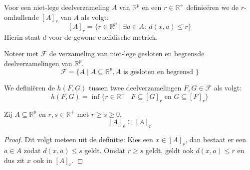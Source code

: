 \documentclass[main.tex]{subfiles}
\begin{document}
\begin{de}
  Voor een niet-lege deelverzameling $A$ van $\mathbb{R}^{p}$ en een $r\in \mathbb{R}^{+}$ definie\"eren we de $r$-omhullende $[A]_{r}$ van $A$ als volgt:
  \[ [A]_{r} = \{r \in \mathbb{R}^{p} \mid \exists a \in A:\ d(x,a) \le r \} \]
  Hierin staat $d$ voor de gewone euclidische metriek.
\end{de}

\begin{de}
  Noteer met $\mathcal{F}$ de verzameling van niet-lege gesloten en begrensde deelverzamelingen van $\mathbb{R}^{p}$.
  \[ \mathcal{F} = \{ A \mid A \subseteq \mathbb{R}^{p}, A \text{ is gesloten en begrensd } \} \]
\end{de}

\begin{de}
  We defini\"eren de  $h(F,G)$ tussen twee deelverzamelingen $F,G \in \mathcal{F}$ als volgt:
  \[ h(F,G) = \inf\{ r\in \mathbb{R}^{+} \mid F \subseteq [G]_{r} \text{ en } G \subseteq [F]_{r} \} \]
\end{de}

\begin{blem}
  \label{lem:omhullenden-in-elkaar}
  Zij $A \subseteq \mathbb{R}^{p}$ en $r,s\in\mathbb{R}^{+}$ met $r\ge s \ge 0$.
  \[ [A]_{s} \subseteq [A]_{r} \]

  \begin{proof}
    Dit volgt meteen uit de definitie:
    Kies een $x\in [A]_{s}$, dan bestaat er een $a\in A$ zodat $d(x,a) \le s$ geldt.
    Omdat $r \ge s$ geldt, geldt ook $d(x,a) \le r$ en dus zit $x$ ook in $[A]_{r}$.
  \end{proof}
\end{blem}
\end{document}
